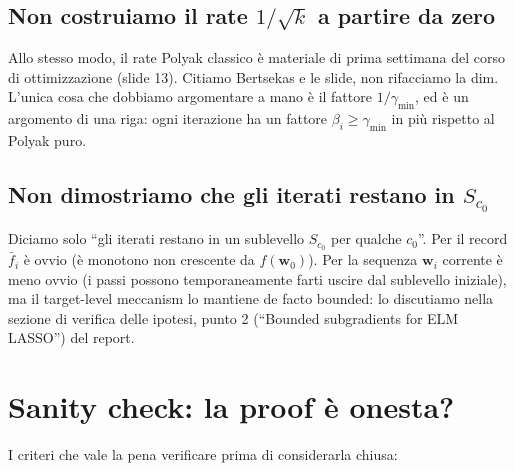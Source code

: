 \documentclass[11pt,a4paper]{article}
\newcommand{\bw}{\mathbf{w}}
\theoremstyle{definition}
\begin{document}
\subsection*{Non costruiamo il rate $1/\sqrt k$ a partire da zero}

Allo stesso modo, il rate Polyak classico è materiale di prima settimana del corso di ottimizzazione (slide 13). Citiamo Bertsekas e le slide, non rifacciamo la dim. L'unica cosa che dobbiamo argomentare a mano è il fattore $1/\gamma_{\min}$, ed è un argomento di una riga: ogni iterazione ha un fattore $\beta_i \ge \gamma_{\min}$ in più rispetto al Polyak puro.

\subsection*{Non dimostriamo che gli iterati restano in $S_{c_0}$}

Diciamo solo ``gli iterati restano in un sublevello $S_{c_0}$ per qualche $c_0$''. Per il record $\bar f_i$ è ovvio (è monotono non crescente da $f(\bw_0)$). Per la sequenza $\bw_i$ corrente è meno ovvio (i passi possono temporaneamente farti uscire dal sublevello iniziale), ma il target-level meccanism lo mantiene de facto bounded: lo discutiamo nella sezione di verifica delle ipotesi, punto 2 (``Bounded subgradients for ELM LASSO'') del report.

\section{Sanity check: la proof è onesta?}

I criteri che vale la pena verificare prima di considerarla chiusa:
\end{document}
